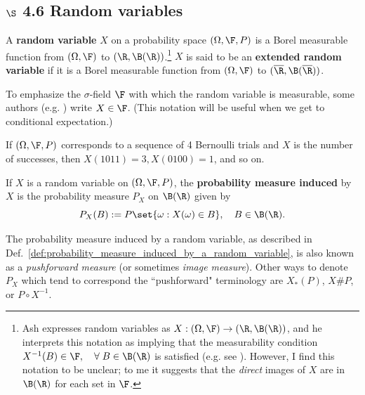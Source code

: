 \documentclass{article} %
\begin{document}
\subsection{$\S$ 4.6 Random variables} \label{sec:random_variables}

\begin{definition}
A \textbf{random variable} $X$ on a probability space $(\Omega, \F, P)$ is a Borel measurable function from $(\Omega, \F)$ to $(\R, \B(\R))$.\footnote{Ash expresses random variables as $X : (\Omega, \F) \to (\R, \B(\R))$, and he interprets this notation as implying that the measurability condition $X^{-1}(B) \in \F, \quad \forall \; B \in \B(\R)$ is satisfied (e.g. see \cite[pp.176, top paragraph before Sec 4.7]{ash2000probability}). However, I find this notation to be unclear; to me it suggests that the \textit{direct} images of $X$ are in $\B(\R)$ for each set in $\F$.}   $X$ is said to be an \textbf{extended random variable}  if it is a Borel measurable function from $(\Omega, \F)$ to $(\overline{\R}, \B(\overline{\R}))$. 
\end{definition}

\begin{notation}
To emphasize the $\sigma$-field $\F$ with which the random variable is measurable, some authors (e.g. \cite{durrett2010probability}) write $X \in \F$.  (This notation will be useful when we get to conditional expectation.)	
\end{notation}


\begin{example}
If $(\Omega, \F, P)$ corresponds to a sequence of 4 Bernoulli trials \cite[Sec.~4.4]{ash2000probability} and $X$ is the number of successes, then $X(1 0 1 1) =3, X(0 1 0 0 ) = 1$, and so on.	
\end{example}


\begin{definition}
If $X$ is a random variable on  $(\Omega, \F, P)$, the \textbf{probability measure induced} by $X$ is the probability measure $P_X$ on $\B(\R)$ given by
\[  P_X(B) := P\set{\omega : X(\omega) \in B}, \quad B \in \B(\R). \] 
\label{def:probability_measure_induced_by_a_random_variable}
\end{definition}

\begin{remark}{}
The probability measure induced by a random variable, as described in  Def.~\ref{def:probability_measure_induced_by_a_random_variable}, is also known as a \textit{pushforward measure} (or sometimes \textit{image measure}).  Other ways to denote $P_X$ which tend to correspond the ``pushforward" terminology are $X_*(P)$, $X\#P$, or $P \circ X^{-1}$.  	
\end{remark}
\end{document}
